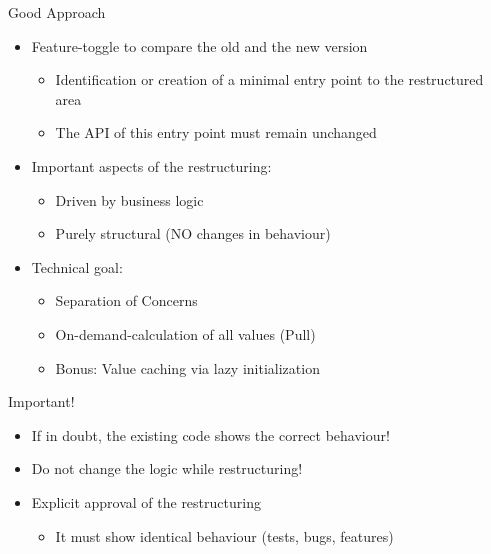 \begin{frame}[fragile]{Good Approach}
\begin{itemize}
\item Feature-toggle to compare the old and the new version
\begin{itemize}
\item Identification or creation of a minimal entry point to the restructured area
\item The API of this entry point must remain unchanged
\end{itemize}
\end{itemize}

\begin{itemize}
\item Important aspects of the restructuring:
\begin{itemize}
\item Driven by business logic
\item Purely structural (NO changes in behaviour)
\end{itemize}
\end{itemize}

\begin{itemize}
\item Technical goal:
\begin{itemize}
\item Separation of Concerns
\item On-demand-calculation of all values (\glqq Pull\grqq{})
\item Bonus: Value caching via lazy initialization
\end{itemize}

\end{itemize}
\end{frame}

\begin{frame}[fragile]{Important!}
\begin{itemize}
\item If in doubt, the existing code shows the correct behaviour!

\item Do not change the logic while restructuring!

\item Explicit approval of the restructuring
\begin{itemize}
\item It must show identical behaviour (tests, bugs, features)
\end{itemize}

\end{itemize}
\end{frame}

